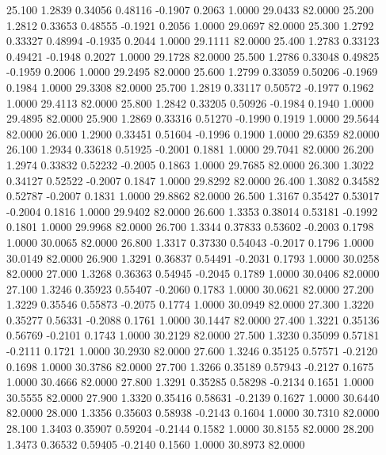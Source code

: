   25.100   1.2839   0.34056   0.48116  -0.1907   0.2063   1.0000  29.0433  82.0000
  25.200   1.2812   0.33653   0.48555  -0.1921   0.2056   1.0000  29.0697  82.0000
  25.300   1.2792   0.33327   0.48994  -0.1935   0.2044   1.0000  29.1111  82.0000
  25.400   1.2783   0.33123   0.49421  -0.1948   0.2027   1.0000  29.1728  82.0000
  25.500   1.2786   0.33048   0.49825  -0.1959   0.2006   1.0000  29.2495  82.0000
  25.600   1.2799   0.33059   0.50206  -0.1969   0.1984   1.0000  29.3308  82.0000
  25.700   1.2819   0.33117   0.50572  -0.1977   0.1962   1.0000  29.4113  82.0000
  25.800   1.2842   0.33205   0.50926  -0.1984   0.1940   1.0000  29.4895  82.0000
  25.900   1.2869   0.33316   0.51270  -0.1990   0.1919   1.0000  29.5644  82.0000
  26.000   1.2900   0.33451   0.51604  -0.1996   0.1900   1.0000  29.6359  82.0000
  26.100   1.2934   0.33618   0.51925  -0.2001   0.1881   1.0000  29.7041  82.0000
  26.200   1.2974   0.33832   0.52232  -0.2005   0.1863   1.0000  29.7685  82.0000
  26.300   1.3022   0.34127   0.52522  -0.2007   0.1847   1.0000  29.8292  82.0000
  26.400   1.3082   0.34582   0.52787  -0.2007   0.1831   1.0000  29.8862  82.0000
  26.500   1.3167   0.35427   0.53017  -0.2004   0.1816   1.0000  29.9402  82.0000
  26.600   1.3353   0.38014   0.53181  -0.1992   0.1801   1.0000  29.9968  82.0000
  26.700   1.3344   0.37833   0.53602  -0.2003   0.1798   1.0000  30.0065  82.0000
  26.800   1.3317   0.37330   0.54043  -0.2017   0.1796   1.0000  30.0149  82.0000
  26.900   1.3291   0.36837   0.54491  -0.2031   0.1793   1.0000  30.0258  82.0000
  27.000   1.3268   0.36363   0.54945  -0.2045   0.1789   1.0000  30.0406  82.0000
  27.100   1.3246   0.35923   0.55407  -0.2060   0.1783   1.0000  30.0621  82.0000
  27.200   1.3229   0.35546   0.55873  -0.2075   0.1774   1.0000  30.0949  82.0000
  27.300   1.3220   0.35277   0.56331  -0.2088   0.1761   1.0000  30.1447  82.0000
  27.400   1.3221   0.35136   0.56769  -0.2101   0.1743   1.0000  30.2129  82.0000
  27.500   1.3230   0.35099   0.57181  -0.2111   0.1721   1.0000  30.2930  82.0000
  27.600   1.3246   0.35125   0.57571  -0.2120   0.1698   1.0000  30.3786  82.0000
  27.700   1.3266   0.35189   0.57943  -0.2127   0.1675   1.0000  30.4666  82.0000
  27.800   1.3291   0.35285   0.58298  -0.2134   0.1651   1.0000  30.5555  82.0000
  27.900   1.3320   0.35416   0.58631  -0.2139   0.1627   1.0000  30.6440  82.0000
  28.000   1.3356   0.35603   0.58938  -0.2143   0.1604   1.0000  30.7310  82.0000
  28.100   1.3403   0.35907   0.59204  -0.2144   0.1582   1.0000  30.8155  82.0000
  28.200   1.3473   0.36532   0.59405  -0.2140   0.1560   1.0000  30.8973  82.0000
